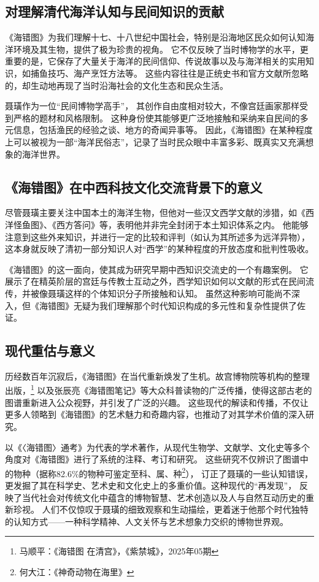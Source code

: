 \documentclass{source/Paper}
\begin{document}
\subsection{对理解清代海洋认知与民间知识的贡献}
《海错图》为我们理解十七、十八世纪中国社会，特别是沿海地区民众如何认知海洋环境及其生物，提供了极为珍贵的视角。
它不仅反映了当时博物学的水平，更重要的是，它保存了大量关于海洋的民间信仰、传说故事以及与海洋相关的实用知识，如捕鱼技巧、海产烹饪方法等。
这些内容往往是正统史书和官方文献所忽略的，却生动地再现了当时沿海社会的文化生态和民众生活。

聂璜作为一位“民间博物学高手”，
其创作自由度相对较大，不像宫廷画家那样受到严格的题材和风格限制。
这种身份使其能够更广泛地接触和采纳来自民间的多元信息，包括渔民的经验之谈、地方的奇闻异事等。
因此，《海错图》在某种程度上可以被视为一部“海洋民俗志”，记录了当时民众眼中丰富多彩、既真实又充满想象的海洋世界。
\subsection{《海错图》在中西科技文化交流背景下的意义}
尽管聂璜主要关注中国本土的海洋生物，但他对一些汉文西学文献的涉猎，如《西洋怪鱼图》、《西方答问》等，表明他并非完全封闭于本土知识体系之内。
他能够注意到这些外来知识，并进行一定的比较和评判（如认为其所述多为远洋异物），这本身就反映了清初一部分知识人对“西学”的某种程度的开放态度和批判性吸收。

《海错图》的这一面向，使其成为研究早期中西知识交流史的一个有趣案例。
它展示了在精英阶层的宫廷与传教士互动之外，西学知识如何以文献的形式在民间流传，并被像聂璜这样的个体知识分子所接触和认知。
虽然这种影响可能尚不深入，但《海错图》无疑为我们理解那个时代知识构成的多元性和复杂性提供了佐证。
\subsection{现代重估与意义}
历经数百年沉寂后，《海错图》在当代重新焕发了生机。故宫博物院等机构的整理出版，\footnote{马顺平：《\textlangle 海错图 \textrangle 在清宫》，《紫禁城》，2025年05期}
以及张辰亮《海错图笔记》等大众科普读物的广泛传播，使得这部古老的图谱重新进入公众视野，并引发了广泛的兴趣。
这些现代的解读和传播，不仅让更多人领略到《海错图》的艺术魅力和奇趣内容，也推动了对其学术价值的深入研究。

以《〈海错图〉通考》为代表的学术著作，从现代生物学、文献学、文化史等多个角度对《海错图》进行了系统的注释、考订和研究。
这些研究不仅辨识了图谱中的物种（据称82.6\%的物种可鉴定至科、属、种\footnote{何大江：《神奇动物在海里》}），
订正了聂璜的一些认知错误，更发掘了其在科学史、艺术史和文化史上的多重价值。这种现代的“再发现”，
反映了当代社会对传统文化中蕴含的博物智慧、艺术创造以及人与自然互动历史的重新珍视。
人们不仅惊叹于聂璜的细致观察和生动描绘，更着迷于他那个时代独特的认知方式——一种科学精神、人文关怀与艺术想象力交织的博物世界观。
\end{document}
